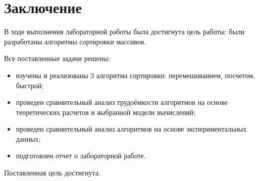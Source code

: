 \chapter*{Заключение}

В ходе выполнения лабораторной работы была достигнута цель работы: были разработаны алгоритмы сортировки массивов.

Все поставленные задачи решены:
\begin{itemize}
	\item изучены и реализованы 3 алгоритма сортировки: перемешиванием, посчетом, быстрой;
	\item проведен сравнительный анализ трудоёмкости алгоритмов на основе теоретических расчетов и выбранной модели вычислений;
	\item проведен сравнительный анализ алгоритмов на основе экспериментальных данных;
	\item подготовлен отчет о лабораторной работе.
\end{itemize}

Поставленная цель достигнута.

